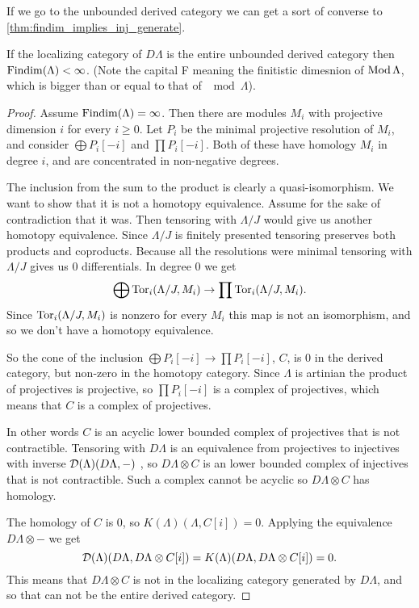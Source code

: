 
If we go to the unbounded derived category we can get a sort of converse to \cref{thm:findim_implies_inj_generate}.

\begin{theorem}\cite[Theorem~4.3]{Rick19}\label{thm:injectives_generate_implies_FDC}
	If the localizing category of $D\Lambda$ is the entire unbounded derived category then $\operatorname{Findim}(\Lambda) < \infty$. (Note the capital F meaning the finitistic dimesnion of $\operatorname{Mod}\Lambda$, which is bigger than or equal to that of $\mod\Lambda$).
	
	\begin{proof}
		Assume $\operatorname{Findim}(\Lambda) = \infty$. Then there are modules $M_i$ with projective dimension $i$ for every $i \geq 0$. Let $P_i$ be the minimal projective resolution of $M_i$, and consider $\bigoplus P_i[-i]$ and $\prod P_i[-i]$. Both of these have homology $M_i$ in degree $i$, and are concentrated in non-negative degrees.
		
		The inclusion from the sum to the product is clearly a quasi-isomorphism. We want to show that it is not a homotopy equivalence. Assume for the sake of contradiction that it was. Then tensoring with $\Lambda/J$ would give us another homotopy equivalence. Since $\Lambda/J$ is finitely presented tensoring preserves both products and coproducts. Because all the resolutions were minimal tensoring with $\Lambda/J$ gives us 0 differentials. In degree 0 we get $$\bigoplus \operatorname{Tor}_i(\Lambda/J, M_i) \to \prod \operatorname{Tor}_i(\Lambda/J, M_i) .$$
		Since $\operatorname{Tor}_i(\Lambda/J, M_i)$ is nonzero for every $M_i$ this map is not an isomorphism, and so we don't have a homotopy equivalence.
		
		So the cone of the inclusion $\bigoplus P_i[-i] \to \prod P_i[-i]$, $C$, is 0 in the derived category, but non-zero in the homotopy category. Since $\Lambda$ is artinian the product of projectives is projective\cite[Theorem~3.3]{Chase60}, so $\prod P_i[-i]$ is a complex of projectives, which means that $C$ is a complex of projectives. 
		
		In other words $C$ is an acyclic lower bounded complex of projectives that is not contractible. Tensoring with $D\Lambda$ is an equivalence from projectives to injectives with inverse $\operatorname{\mathcal{D}}(\Lambda)(D\Lambda, -)$ , so $D\Lambda \otimes C$ is an lower bounded complex of injectives that is not contractible. Such a complex cannot be acyclic so $D\Lambda \otimes C$ has homology.
		
		The homology of $C$ is 0, so $K(\Lambda)(\Lambda, C[i]) = 0$. Applying the equivalence $D\Lambda \otimes -$ we get $$\operatorname{\mathcal{D}}(\Lambda)(D\Lambda, D\Lambda \otimes C [i])=K(\Lambda)(D\Lambda, D\Lambda \otimes C [i])=0.$$ This means that $D\Lambda \otimes C$ is not in the localizing category generated by $D\Lambda$, and so that can not be the entire derived category.
	\end{proof}
\end{theorem}


